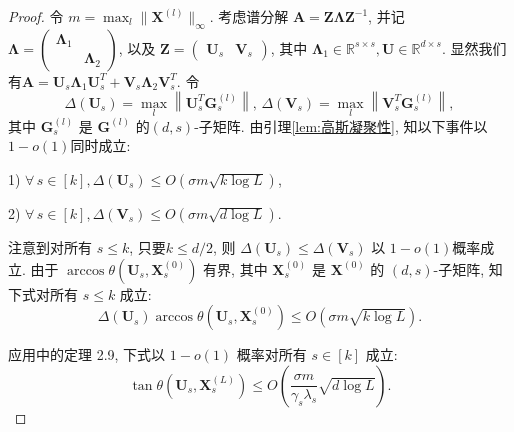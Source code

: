 \begin{proof}
  	令 $m = \max_l\|\mathbf{X}^{(l)}\|_\infty$. 考虑谱分解 $\mathbf{A} = \mathbf{Z}\boldsymbol{\Lambda}\mathbf{Z}^{-1}$, 并记 $\boldsymbol{\Lambda} = \begin{pmatrix}
  		\boldsymbol{\Lambda}_1 & \\
  		& \boldsymbol{\Lambda}_2
  	\end{pmatrix}$, 以及 $\mathbf{Z} = \begin{pmatrix}
  		\mathbf{U}_s & \mathbf{V}_s
  	\end{pmatrix}$,
  	 其中 $\boldsymbol{\Lambda}_1 \in \mathbb{R}^{s\times s}, \mathbf{U} \in \mathbb{R}^{d\times s}$. 显然我们有$\mathbf{A} = \mathbf{U}_s\boldsymbol{\Lambda}_1\mathbf{U}_s^T + \mathbf{V}_s\boldsymbol{\Lambda}_2\mathbf{V}_s^T$.
  令
  \[
  \Delta(\mathbf{U}_s) = \max_{l} \left\|\mathbf{U}_s^T\mathbf{G}_s^{(l)}\right\|,\, \Delta(\mathbf{V}_s) = \max_{l} \left\|\mathbf{V}_s^T\mathbf{G}_s^{(l)}\right\|,
  \]
  其中 $\mathbf{G}_s^{(l)}$ 是 $\mathbf{G}^{(l)}$ 的$(d, s)$-子矩阵. 由引理\ref{lem:高斯凝聚性}, 知以下事件以$1 - o(1)$同时成立:
	
  	 1) $\forall\,s\in[k], \Delta(\mathbf{U}_s) \le O\left(\sigma m\sqrt{k\log L}\right)$,
	
  	 2) $\forall\,s\in[k], \Delta(\mathbf{V}_s) \le O\left(\sigma m\sqrt{d\log L}\right)$.

  注意到对所有 $s\le k$, 只要$k\le d/2$, 则 $\Delta(\mathbf{U}_s) \le \Delta(\mathbf{V}_s)$ 以 $ 1- o(1)$概率成立. 由于 $\arccos\theta(\mathbf{U}_s, \mathbf{X}_s^{(0)})$ 有界, 其中 $\mathbf{X}_s^{(0)}$ 是 $\mathbf{X}^{(0)}$ 的  $(d, s)$-子矩阵, 知下式对所有 $s\le k$ 成立:
  \[
  	\Delta(\mathbf{U}_s)\arccos\theta\left(\mathbf{U}_s, \mathbf{X}_s^{(0)}\right) \le O\left(\sigma m\sqrt{k\log L}\right).
  \]
  
  应用\parencite{hardt2013robust}中的定理 2.9, 下式以 $1-o(1)$ 概率对所有 $s\in [k]$ 成立:
  \begin{equation}\label{eq:tan夹角收敛}
  	\tan\theta(\mathbf{U}_s, \mathbf{X}_s^{(L)}) \le O\left( \frac{\sigma m}{\gamma_s\lambda_s} \sqrt{ d \log L}\right).
  \end{equation}


\end{proof}
